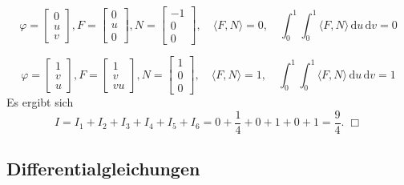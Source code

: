 \documentclass[a4paper,10pt,fleqn,twoside]{scrartcl}
\numberwithin{equation}{section}
\theoremstyle{Aufgabe}
\begin{document}
\[
\varphi = \begin{bmatrix}0\\ u\\ v\end{bmatrix},
F = \begin{bmatrix}0\\ u\\ 0\end{bmatrix},
N = \begin{bmatrix}-1\\ 0\\ 0\end{bmatrix},
\quad\langle F,N\rangle = 0,
\quad\int_0^1 \int_0^1 \langle F,N\rangle\,\mathrm du\,\mathrm dv = 0
\]

\[
\varphi = \begin{bmatrix}1\\ v\\ u\end{bmatrix},
F = \begin{bmatrix}1\\ v\\ vu\end{bmatrix},
N = \begin{bmatrix}1\\ 0\\ 0\end{bmatrix},
\quad\langle F,N\rangle = 1,
\quad\int_0^1 \int_0^1 \langle F,N\rangle\,\mathrm du\,\mathrm dv = 1
\]
Es ergibt sich
\[I = I_1+I_2+I_3+I_4+I_5+I_6 = 0+\frac{1}{4}+0+1+0+1 = \frac{9}{4}.\;\Box\]

\subsection{Differentialgleichungen}
\end{document}
